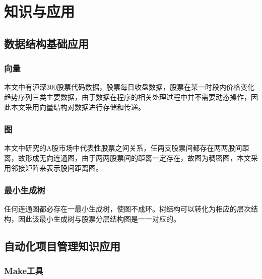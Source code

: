 \section{知识与应用}
\subsection{数据结构基础应用}
\subsubsection{向量}
本文中有沪深300股票代码数据，股票每日收盘数据，股票在某一时段内价格变化趋势序列三类主要数据，由于数据在程序的相关处理过程中并不需要动态操作，因此本文采用向量结构对数据进行存储和传递。
\subsubsection{图}
本文中研究的A股市场中代表性股票之间关系，任两支股票间都存在两两股间距离，故形成无向连通图，由于两两股票间的距离一定存在，故图为稠密图，本文采用邻接矩阵来表示股间距离图。
\subsubsection{最小生成树}
任何连通图都必存在一最小生成树，使图不成环。树结构可以转化为相应的层次结构，因此该最小生成树与股票分层结构图是一一对应的。
\subsection{自动化项目管理知识应用}
\subsubsection{Make工具}

